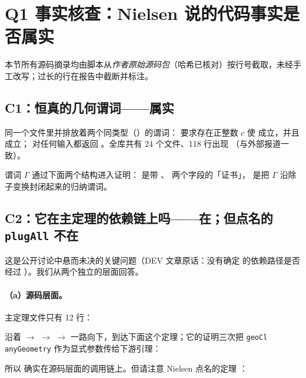 \section{Q1 事实核查：Nielsen 说的代码事实是否属实}
\label{sec:facts}

本节所有源码摘录均由脚本从\emph{作者原始源码包}（哈希已核对）按行号截取，未经手工改写；过长的行在报告中截断并标注。

\subsection{C1：恒真的几何谓词——属实}
\label{sec:fact-def}


同一个文件里并排放着两个同类型（）的谓词： 要求存在正整数 $c$ 使  成立，并且  成立；
 对任何输入都返回 。全库共有 24 个文件、118 行出现 （与外部报道一致）。

谓词 $\Gamma$ 通过下面两个结构进入证明： 是带 、 两个字段的「证书」， 是把 $\Gamma$ 沿除子变换封闭起来的归纳谓词。


\subsection{C2：它在主定理的依赖链上吗——在；但点名的 \texttt{plugAll} 不在}
\label{sec:fact-path}

这是公开讨论中悬而未决的关键问题（DEV 文章原话：没有确定  的依赖路径是否经过 ）。我们从两个独立的层面回答。

\paragraph{（a）源码层面。}主定理文件只有 12 行：


沿着  $\to$  $\to$  $\to$ 
一路向下，到达下面这个定理；它的证明三次把 \texttt{geoCl anyGeometry} 作为显式参数传给下游引理：


所以  确实在源码层面的调用链上。但请注意 Nielsen 点名的定理 ：

